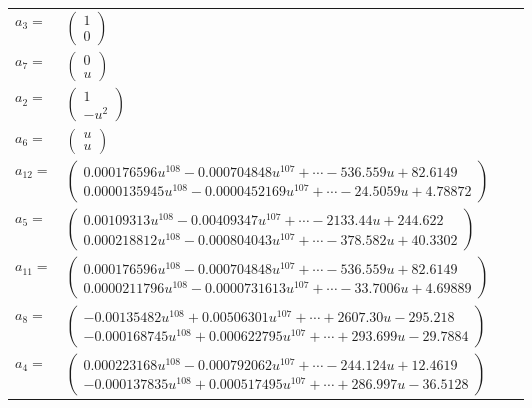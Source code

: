 \documentclass[1p]{elsarticle_modified}
\theoremstyle{definition}
\begin{document}
\begin{tabular}{m{7pt} m{180pt} m{7pt} m{180pt} }
\flushright $a_{3}=$&$\begin{pmatrix}1\\0\end{pmatrix}$ \\
\flushright $a_{7}=$&$\begin{pmatrix}0\\u\end{pmatrix}$ \\
\flushright $a_{2}=$&$\begin{pmatrix}1\\- u^2\end{pmatrix}$ \\
\flushright $a_{6}=$&$\begin{pmatrix}u\\u\end{pmatrix}$ \\
\flushright $a_{12}=$&$\begin{pmatrix}0.000176596 u^{108}-0.000704848 u^{107}+\cdots-536.559 u+82.6149\\0.0000135945 u^{108}-0.0000452169 u^{107}+\cdots-24.5059 u+4.78872\end{pmatrix}$ \\
\flushright $a_{5}=$&$\begin{pmatrix}0.00109313 u^{108}-0.00409347 u^{107}+\cdots-2133.44 u+244.622\\0.000218812 u^{108}-0.000804043 u^{107}+\cdots-378.582 u+40.3302\end{pmatrix}$ \\
\flushright $a_{11}=$&$\begin{pmatrix}0.000176596 u^{108}-0.000704848 u^{107}+\cdots-536.559 u+82.6149\\0.0000211796 u^{108}-0.0000731613 u^{107}+\cdots-33.7006 u+4.69889\end{pmatrix}$ \\
\flushright $a_{8}=$&$\begin{pmatrix}-0.00135482 u^{108}+0.00506301 u^{107}+\cdots+2607.30 u-295.218\\-0.000168745 u^{108}+0.000622795 u^{107}+\cdots+293.699 u-29.7884\end{pmatrix}$ \\
\flushright $a_{4}=$&$\begin{pmatrix}0.000223168 u^{108}-0.000792062 u^{107}+\cdots-244.124 u+12.4619\\-0.000137835 u^{108}+0.000517495 u^{107}+\cdots+286.997 u-36.5128\end{pmatrix}$ \\

\end{tabular}
\end{document}
